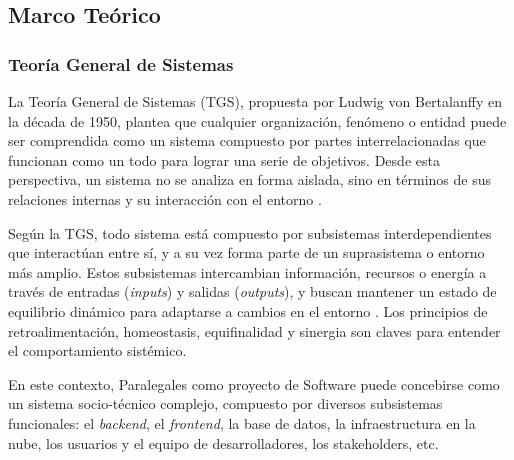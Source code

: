 \subsection{Marco Teórico}

\subsubsection{Teoría General de Sistemas}

La Teoría General de Sistemas (TGS), propuesta por Ludwig von Bertalanffy en la década de 1950, plantea que cualquier organización, fenómeno o entidad puede ser comprendida como un sistema compuesto por partes interrelacionadas que funcionan como un todo para lograr una serie de objetivos. Desde esta perspectiva, un sistema no se analiza en forma aislada, sino en términos de sus relaciones internas y su interacción con el entorno \cite{Bertalanffy1968}.

Según la TGS, todo sistema está compuesto por subsistemas interdependientes que interactúan entre sí, y a su vez forma parte de un suprasistema o entorno más amplio. Estos subsistemas intercambian información, recursos o energía a través de entradas (\textit{inputs}) y salidas (\textit{outputs}), y buscan mantener un estado de equilibrio dinámico para adaptarse a cambios en el entorno \cite{Bertalanffy1968}. Los principios de retroalimentación, homeostasis, equifinalidad y sinergia son claves para entender el comportamiento sistémico.

En este contexto, Paralegales como proyecto de Software puede concebirse como un sistema socio-técnico complejo, compuesto por diversos subsistemas funcionales: el \textit{backend}, el \textit{frontend}, la base de datos, la infraestructura en la nube, los usuarios y el equipo de desarrolladores, los stakeholders, etc.

